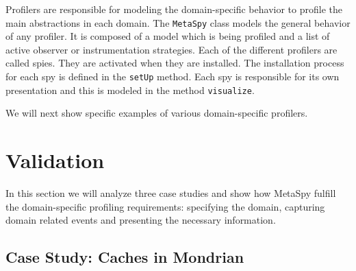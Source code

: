 \documentclass[runningheads]{llncs}
\newcommand{\project}{{\sc MetaSpy}\xspace}
\newcommand{\ct}{\lstinline[backgroundcolor=\color{white},basicstyle=\footnotesize\ttfamily]}
\newcommand{\seclabel}[1]{\label{sec:#1}}
\begin{document}
Profilers are responsible for modeling the domain-specific behavior to profile the main abstractions in each domain.
The \ct{MetaSpy} class models the general behavior of any profiler. It is composed of a model which is being profiled and a list of active observer or instrumentation strategies.
Each of the different profilers are called spies. They are activated when they are installed. The installation process for each spy is defined in the \ct{setUp} method.
Each spy is responsible for its own presentation and this is modeled in the method \ct{visualize}.

We will next show specific examples of various domain-specific profilers.


\section{Validation}\seclabel{validation}

In this section we will analyze three case studies and show how \project fulfill the domain-specific profiling requirements: specifying the domain, capturing domain related events and presenting the necessary information.

\subsection{Case Study: Caches in Mondrian}
\end{document}
